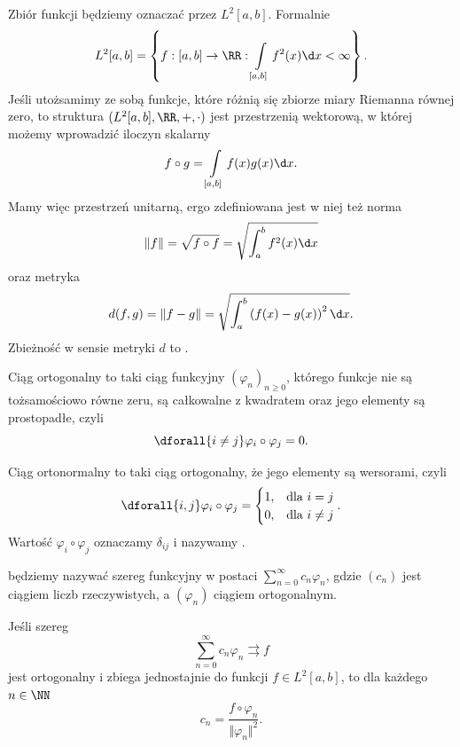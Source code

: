 Zbiór funkcji  będziemy oznaczać przez $L^2[a, b]$. Formalnie
\[ L^2[a, b] = \left\{f: [a, b] \to \RR : \int\limits_{[a, b]} f^2(x) \d x < \infty \right\}. \]
Jeśli utożsamimy ze sobą funkcje, które różnią się zbiorze miary Riemanna równej zero, to struktura $(L^2[a, b], \RR, +, \cdot)$ jest przestrzenią wektorową, w której możemy wprowadzić iloczyn skalarny
\[ f \circ g = \int\limits_{[a, b]} f(x)g(x) \d x. \]
Mamy więc przestrzeń unitarną, ergo zdefiniowana jest w niej też norma
\[ \Vert f \Vert = \sqrt{f \circ f} = \sqrt{\int_a^b f^2(x) \d x} \]
oraz metryka
\[ d(f, g) = \Vert f - g \Vert = \sqrt{\int_a^b \left(f(x) - g(x)\right)^2 \d x}. \]
Zbieżność w sensie metryki $d$ to .

\begin{definition}
    Ciąg ortogonalny to taki ciąg funkcyjny $(\varphi_n)_{n\geq 0}$, którego funkcje nie są tożsamościowo równe zeru, są całkowalne z kwadratem oraz jego elementy są prostopadłe, czyli
    \[ \dforall{i \neq j} \varphi_i \circ \varphi_j = 0. \]
\end{definition}

\begin{definition}
    Ciąg ortonormalny to taki ciąg ortogonalny, że jego elementy są wersorami, czyli
    \[ \dforall{i, j} \varphi_i \circ \varphi_j = \begin{cases}1, & \text{dla } i = j \\ 0, & \text{dla } i \neq j\end{cases}. \]
    Wartość $\varphi_i \circ \varphi_j$ oznaczamy $\delta_{ij}$ i nazywamy .
\end{definition}

 będziemy nazywać szereg funkcyjny w postaci $\sum_{n=0}^\infty c_n\varphi_n$, gdzie $(c_n)$ jest ciągiem liczb rzeczywistych, a $(\varphi_n)$ ciągiem ortogonalnym.

\begin{theorem}
    \label{t:Euler-Fourier}
    Jeśli szereg
    \[ \sum_{n=0}^\infty c_n\varphi_n \rightrightarrows f \]
    jest ortogonalny i zbiega jednostajnie do funkcji $f \in L^2[a, b]$, to dla każdego $n \in \NN$
    \[ c_n = \frac{f \circ \varphi_n}{\Vert \varphi_n \Vert^2}. \]
\end{theorem}

